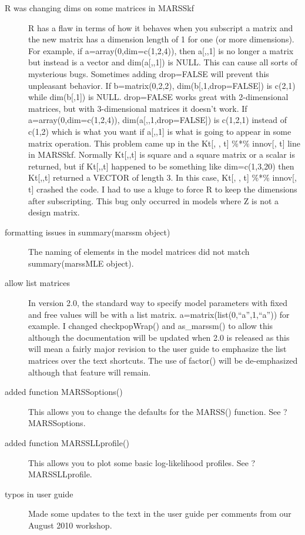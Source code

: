 \documentclass[12pt]{article}
\begin{document}
\begin{description}
    \item[R was changing dims on some matrices in MARSSkf]R has a flaw in terms of how it behaves when you subscript a matrix and the new matrix has a dimension length of 1 for one (or more dimensions).  For example, if a=array(0,dim=c(1,2,4)), then a[,,1] is no longer a matrix but instead is a vector and dim(a[,,1]) is NULL.  This can cause all sorts of mysterious bugs.  Sometimes adding drop=FALSE will prevent this unpleasant behavior.  If b=matrix(0,2,2), dim(b[,1,drop=FALSE]) is c(2,1) while dim(b[,1]) is NULL.  drop=FALSE works great with 2-dimensional matrices, but with 3-dimensional matrices it doesn't work.  If a=array(0,dim=c(1,2,4)), dim(a[,,1,drop=FALSE]) is c(1,2,1) instead of c(1,2) which is what you want if a[,,1] is what is going to appear in some matrix operation. This problem came up in the Kt[, , t] \%*\% innov[, t] line in MARSSkf.  Normally Kt[,,t] is square and a square matrix or a scalar is returned, but if Kt[,,t] happened to be something like dim=c(1,3,20) then Kt[,,t] returned a VECTOR of length 3.  In this case, Kt[, , t] \%*\% innov[, t] crashed the code.  I had to use a kluge to force R to keep the dimensions after subscripting. This bug only occurred in models where Z is not a design matrix.
    \item[formatting issues in summary(marssm object)]The naming of elements in the model matrices did not match summary(marssMLE object).
    \item[allow list matrices]In version 2.0, the standard way to specify model parameters with fixed and free values will be with a list matrix.  a=matrix(list(0,``a'',1,``a'')) for example.  I changed checkpopWrap() and as\_marssm() to allow this although the documentation will be updated when 2.0 is released as this will mean a fairly major revision to the user guide to emphasize the list matrices over the text shortcuts.  The use of factor() will be de-emphasized although that feature will remain.
    \item[added function MARSSoptions()]This allows you to change the defaults for the MARSS() function.  See ?MARSSoptions.
    \item[added function MARSSLLprofile()]This allows you to plot some basic log-likelihood profiles.  See ?MARSSLLprofile.
    \item[typos in user guide]Made some updates to the text in the user guide per comments from our August 2010 workshop.
\end{description}
\end{document}
